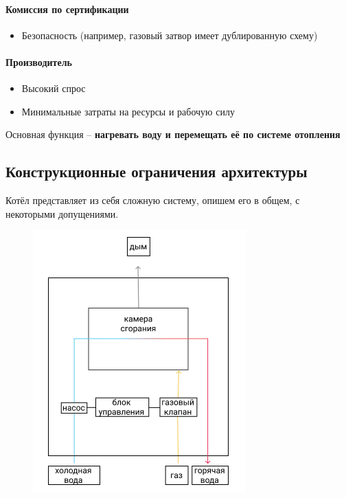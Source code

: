 \documentclass[bibliography=totocnumbered]{scrartcl}
\begin{document}
\paragraph{Комиссия по сертификации}
\begin{itemize}
    \item Безопасность (например, газовый затвор имеет дублированную схему)
\end{itemize}

\paragraph{Производитель}
\begin{itemize}
    \item Высокий спрос
    \item Минимальные затраты на ресурсы и рабочую силу
\end{itemize}
Основная функция -- \textbf{нагревать воду и перемещать её по системе отопления}

\subsection{Конструкционные ограничения архитектуры}
Котёл представляет из себя сложную систему, опишем его в общем, с некоторыми допущениями.

\begin{figure}[htp]
    \centering
    \includegraphics[scale=1.00]{arch.png}
\end{figure}
\end{document}
